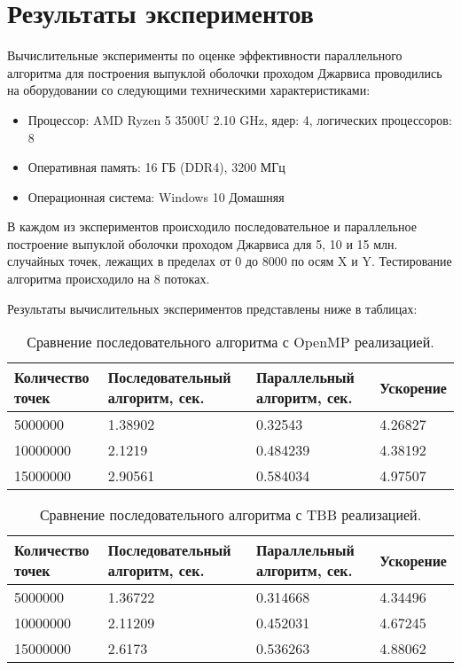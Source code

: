 \documentclass{report}
\begin{document}
\section*{Результаты экспериментов}
Вычислительные эксперименты по оценке эффективности параллельного алгоритма для построения выпуклой оболочки проходом Джарвиса проводились на оборудовании со следующими техническими характеристиками:
\begin{itemize}
\item Процессор: AMD Ryzen 5 3500U 2.10 GHz, ядер: 4, логических процессоров: 8
\item Оперативная память: 16 ГБ (DDR4), 3200 МГц
\item Операционная система: Windows 10 Домашняя
\end{itemize}

\par В каждом из экспериментов происходило последовательное и параллельное построение выпуклой оболочки проходом Джарвиса для 5, 10 и 15 млн. случайных точек, лежащих в пределах от 0 до 8000 по осям X и Y. Тестирование алгоритма происходило на 8 потоках.

\par Результаты вычислительных экспериментов представлены ниже в таблицах:

\begin{table}[!h]
\centering
\begin{tabular}{| p{2.5cm} | p{3.5cm} | p{3cm} | p{2.5cm} |}
\hline
Количество точек & Последовательный алгоритм, сек. & Параллельный алгоритм, сек. & Ускорение \\
\hline
5000000      & 1.38902    & 0.32543     & 4.26827       \\
\hline
10000000       & 2.1219     & 0.484239     & 4.38192       \\
\hline
15000000       & 2.90561    & 0.584034     & 4.97507      \\
\hline
\end{tabular}
\caption{Сравнение последовательного алгоритма с OpenMP реализацией.}
\end{table}
\begin{table}[!h]
\centering
\begin{tabular}{| p{2.5cm} | p{3.5cm} | p{3cm} | p{2.5cm} |}
\hline
Количество точек & Последовательный алгоритм, сек. & Параллельный алгоритм, сек. & Ускорение \\[5pt]
\hline
5000000      & 1.36722    & 0.314668     & 4.34496       \\
\hline
10000000       & 2.11209     & 0.452031     & 4.67245       \\
\hline
15000000       & 2.6173    & 0.536263     & 4.88062      \\
\hline
\end{tabular}
\caption{Сравнение последовательного алгоритма с TBB реализацией.}
\end{table}
\end{document}
